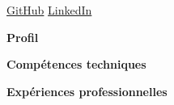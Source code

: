 \documentclass[a4paper,10pt]{article}
\begin{document}
\begin{center}
    {\LARGE \textbf{\myname}}\\
    \textit{\myjob} \\
    \vspace{2mm}
    \href{mailto:\mymail}{\mymail} \textbullet{}
    \href{\mygithub}{GitHub} \textbullet{}
    \href{\mylinkedin}{LinkedIn} \textbullet{}
    \mylocation
\end{center}

\vspace{3mm}

\textbf{\textcolor{main}{Profil}}\\
\mytagline

\vspace{3mm}
\textbf{\textcolor{main}{Compétences techniques}}

\mytechskills

\vspace{3mm}
\textbf{\textcolor{main}{Expériences professionnelles}}

\myexperiences

\vfill

\begin{center}
    \textcolor{accent}{\small \myprofil}
\end{center}
\end{document}

